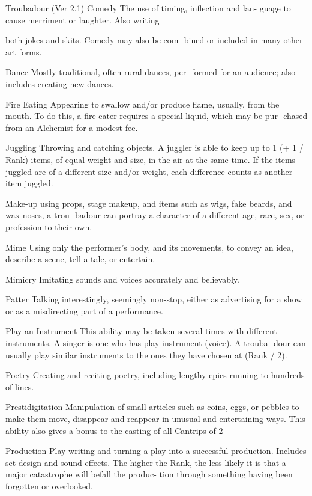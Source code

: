 \begin{Chapter}{Troubadour (Ver 2.1)}
Comedy  The  use  of  timing,  inflection  and  lan-
guage to cause merriment or laughter. Also writing 

both  jokes  and  skits.  Comedy  may  also  be  com-
bined or included in many other art forms. 

Dance  Mostly  traditional,  often  rural  dances,  per-
formed for an audience; also includes creating new 
dances. 

Fire Eating Appearing to swallow and/or produce 
flame,  usually,  from  the  mouth.  To  do  this,  a  fire 
eater  requires  a  special  liquid,  which  may  be  pur-
chased from an Alchemist for a modest fee. 

Juggling Throwing and catching objects. A juggler 
is able to keep up to 1 (+ 1 / Rank) items, of equal 
weight  and  size,  in  the  air  at  the  same  time.  If  the 
items juggled are of a different size and/or weight, 
each difference counts as another item juggled. 

Make-up  using  props,  stage  makeup,  and  items 
such  as  wigs,  fake  beards,  and  wax  noses,  a  trou-
badour  can  portray  a  character  of  a  different  age, 
race, sex, or profession to their own. 

Mime  Using  only  the  performer’s  body,  and  its 
movements,  to  convey  an  idea,  describe  a  scene, 
tell a tale, or entertain. 

Mimicry  Imitating  sounds  and  voices  accurately 
and believably. 

Patter  Talking  interestingly,  seemingly  non-stop, 
either as advertising for a show or as a misdirecting 
part of a performance. 

Play  an  Instrument  This  ability  may  be  taken 
several  times  with  different  instruments.  A  singer 
is  one  who  has  play  instrument  (voice).  A  trouba-
dour  can  usually  play  similar  instruments  to  the 
ones they have chosen at (Rank / 2). 

Poetry  Creating  and  reciting  poetry,  including 
lengthy epics running to hundreds of lines. 

Prestidigitation  Manipulation  of  small  articles 
such as coins, eggs, or pebbles to make them move, 
disappear and reappear in unusual and entertaining 
ways. This ability also gives a bonus to the casting 
of all Cantrips of 2%

Production  Play  writing and turning  a play  into  a 
successful  production.  Includes  set  design  and 
sound effects. The higher the Rank, the less likely 
it is that a major catastrophe will befall the produc-
tion  through  something  having  been  forgotten  or 
overlooked. 


\end{Chapter}
